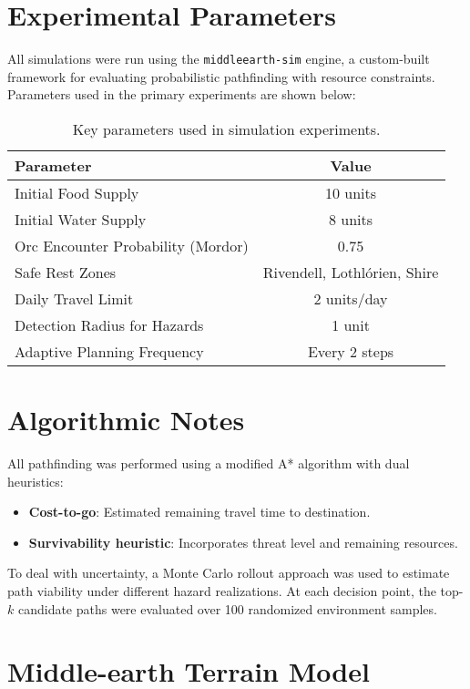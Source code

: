\documentclass[main.tex]{subfiles}
\begin{document}
\section{Experimental Parameters}

All simulations were run using the \texttt{middleearth-sim} engine, a custom-built framework for evaluating probabilistic pathfinding with resource constraints. Parameters used in the primary experiments are shown below:

\begin{table}[h]
\centering
\begin{tabular}{l c}
\toprule
\textbf{Parameter} & \textbf{Value} \\
\midrule
Initial Food Supply & 10 units \\
Initial Water Supply & 8 units \\
Orc Encounter Probability (Mordor) & 0.75 \\
Safe Rest Zones & Rivendell, Lothlórien, Shire \\
Daily Travel Limit & 2 units/day \\
Detection Radius for Hazards & 1 unit \\
Adaptive Planning Frequency & Every 2 steps \\
\bottomrule
\end{tabular}
\caption{Key parameters used in simulation experiments.}
\end{table}

\section{Algorithmic Notes}

\noindent
All pathfinding was performed using a modified A* algorithm with dual heuristics:
\begin{itemize}
    \item \textbf{Cost-to-go}: Estimated remaining travel time to destination.
    \item \textbf{Survivability heuristic}: Incorporates threat level and remaining resources.
\end{itemize}

To deal with uncertainty, a Monte Carlo rollout approach was used to estimate path viability under different hazard realizations. At each decision point, the top-$k$ candidate paths were evaluated over 100 randomized environment samples.

\section{Middle-earth Terrain Model}
\end{document}
